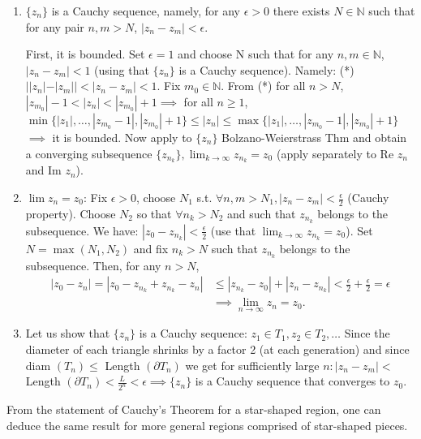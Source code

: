    \begin{enumerate}
        \item $\{z_n\}$ is a Cauchy sequence, namely, for any $\epsilon > 0$ there exists $N \in \mathbb{N}$ such that for any pair $n, m > N$, $|z_n - z_m| < \epsilon$.
        
        First, it is bounded. Set $\epsilon = 1$ and choose N such that for any $n, m \in \mathbb{N}$, $|z_n - z_m| < 1$ (using that $\{z_n\}$ is a Cauchy sequence).
        Namely: (*) $||z_n| - |z_m|| < |z_n - z_m| < 1$. Fix $m_0 \in \mathbb{N}$.
        From (*) for all $n > N$, $|z_{m_0}| - 1 < |z_n| < |z_{m_0}| + 1 \implies$ for 
        all $n \geq 1$, $\min\{|z_1|, \dots, |z_{m_0}-1|, |z_{m_0}|+1\} \leq |z_n| \leq \max\{|z_1|, \dots, |z_{m_0}-1|, |z_{m_0}|+1\}$ $\implies$ it is bounded.
        Now apply to $\{z_n\}$ Bolzano-Weierstrass Thm and obtain a converging subsequence $\{z_{n_k}\}, \lim_{k \to \infty} z_{n_k} = z_0$ (apply separately to Re $z_n$ and Im $z_n$).
        \item $\lim z_n = z_0$: Fix $\epsilon > 0$, choose $N_1$ s.t. $\forall n, m > N_1, |z_n - z_m| < \frac{\epsilon}{2}$ (Cauchy property).
        Choose $N_2$ so that $\forall n_k > N_2$ and such that $z_{n_k}$ belongs to the subsequence. 
        We have: $|z_0 - z_{n_k}| < \frac{\epsilon}{2}$ (use that $\lim_{k \to \infty} z_{n_k} = z_0$). 
        Set $N = \max(N_1, N_2)$ and fix $n_k > N$ such that $z_{n_k}$ belongs to the subsequence. 
        Then, for any $n > N$,
        \begin{align*}
            |z_0 - z_n| = |z_0 - z_{n_k} + z_{n_k} - z_n| &\leq |z_{n_k} - z_0| + |z_n - z_{n_k}| < \frac{\epsilon}{2} + \frac{\epsilon}{2} = \epsilon \\ 
            &\implies \lim_{n \to \infty} z_n = z_0.
        \end{align*} 
        \item Let us show that $\{z_n\}$ is a Cauchy sequence: $z_1 \in T_1, z_2 \in T_2, \dots$ 
        Since the diameter of each triangle shrinks by a factor 2 (at each generation) and since 
        diam $(T_n) \leq$ Length $(\partial T_n)$ we get for sufficiently large $n: |z_n - z_m| <$ Length $(\partial T_n) < \frac{L}{2^n} < \epsilon \implies \{z_n\}$ is a 
        Cauchy sequence that converges to $z_0$.
    \end{enumerate}

From the statement of Cauchy's Theorem for a star-shaped region, one can deduce the same result for more general regions comprised of star-shaped pieces.

